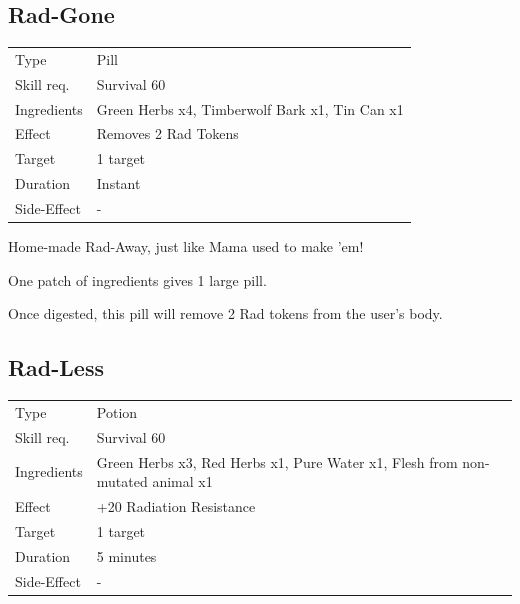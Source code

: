 \documentclass[11pt,a4paper,twocolumn]{book}
\begin{document}
\subsection*{Rad-Gone}
{
	\begin{tabu} to 75mm{| X[l,4] | X[l,8] |}
		\hline
		Type 			& Pill 														\\
        Skill req.	    & Survival 60 												\\
        Ingredients     & Green Herbs x4, Timberwolf Bark x1, Tin Can x1			\\
        Effect     		& Removes 2 Rad Tokens 										\\
        Target      	& 1 target													\\
        Duration  		& Instant 													\\
        Side-Effect     & -															\\ \hline
	\end{tabu}
		
}

\medskip

Home-made Rad-Away, just like Mama used to make 'em!

One patch of ingredients gives 1 large pill.

Once digested, this pill will remove 2 Rad tokens from the user's body.


\subsection*{Rad-Less}
{
	\begin{tabu} to 75mm{| X[l,4] | X[l,8] |}
		\hline
		Type 			& Potion 													\\
        Skill req.	    & Survival 60 												\\
        Ingredients     & Green Herbs x3, Red Herbs x1, Pure Water x1, Flesh from non-mutated animal x1				\\
        Effect     		& +20 Radiation Resistance 								\\
        Target      	& 1 target													\\
        Duration  		& 5 minutes	 												\\
        Side-Effect     & -															\\ \hline
	\end{tabu}
		
}
\end{document}
